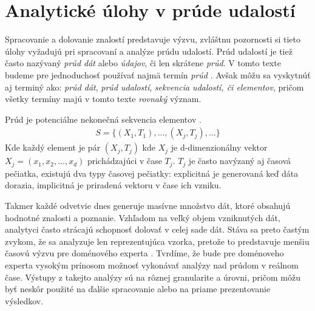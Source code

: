 \chapter{Analytické úlohy v prúde udalostí}
\label{Analytické úlohy v prúde udalostí}
Spracovanie a dolovanie znalostí predstavuje výzvu, zvláštnu pozornosti si tieto úlohy vyžadujú pri spracovaní a analýze prúdu udalostí. Prúd udalostí je tiež často nazývaný \textit{prúd dát} alebo \textit{údajov}, či len skrátene \textit{prúd}. V tomto texte budeme pre jednoduchosť používať najmä termín \textit{prúd} \citep{tran2014change}. Avšak môžu sa vyskytnúť aj terminý ako: \textit{prúd dát}, \textit{prúd udalostí}, \textit{sekvencia udalostí, či elementov}, pričom všetky termíny majú v tomto texte \textit{rovnaký} význam.\\
\begin{definition}{Prúd je potenciálne nekonečná sekvencia elementov \citep{tran2014change}.}
\begin{align*}
	S = \{(X_1,T_1), ..., (X_j,T_j), ...\}
\end{align*}
Kde každý element je pár $(X_j,T_j)$ kde $X_j$ je d-dimenzionálny vektor $X_j = (x_1, x_2, ..., x_d)$ prichádzajúci v čase $T_j$. $T_j$ je často navýzaný aj časová pečiatka, existujú dva typy časovej pečiatky: explicitná je generovaná keď dáta dorazia, implicitná je priradená vektoru v čase ich vzniku.
\end{definition}

Takmer každé odvetvie dnes generuje masívne množstvo dát, ktoré obsahujú hodnotné znalosti a poznanie. Vzhľadom na veľký objem vzniknutých dát, analytyci často strácajú schopnosť dolovať v celej sade dát. Stáva sa preto častým zvykom, že sa analyzuje len reprezentujúca vzorka, pretože to predstavuje menšiu časovú výzvu pre doménového experta \citep{hulten2001mining}. Tvrdíme, že bude pre doménoveho experta vysokým prínosom možnosť vykonávať analýzy nad prúdom v reálnom čase. Výstupy z takejto analýzy sú na rôznej granularite a úrovni, pričom môžu byť neskôr použité na ďalšie spracovanie alebo na priame prezentovanie výsledkov.

